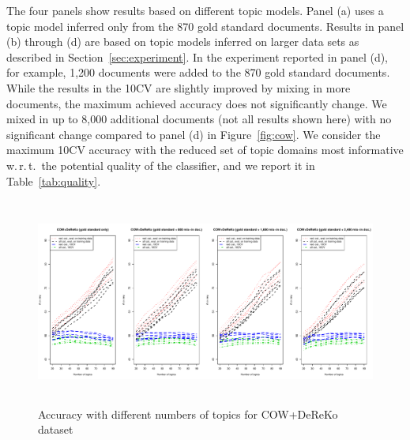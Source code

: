 \documentclass[11pt]{article}
\begin{document}
The four panels show results based on different topic models.
Panel (a) uses a topic model inferred only from the 870 gold standard documents.
Results in panel (b) through (d) are based on topic models inferred on larger data sets as described in Section~\ref{sec:experiment}.
In the experiment reported in panel (d), for example, 1,200 documents were added to the 870 gold standard documents.
While the results in the 10CV are slightly improved by mixing in more documents, the maximum achieved accuracy does not significantly change.
We mixed in up to 8,000 additional documents (not all results shown here) with no significant change compared to panel (d) in Figure~\ref{fig:cow}.
We consider the maximum 10CV accuracy with the reduced set of topic domains most informative w.\,r.\,t.\ the potential quality of the classifier, and we report it in Table~\ref{tab:quality}.


\begin{figure}[h]
  \centering
  \includegraphics[width=\textwidth, height=6.8cm]{graphics/coreko.pdf}
  \caption{Accuracy with different numbers of topics for COW+DeReKo dataset}
  \label{fig:coreko}
\end{figure}
\end{document}
